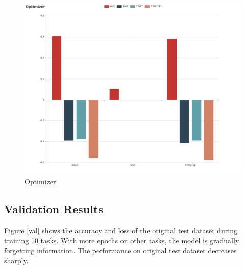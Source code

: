 \documentclass{article}
\begin{document}
\begin{figure}[htbp]
\centering
\includegraphics[scale=0.3]{img/Optimizer.png}
\caption{Optimizer}
\label{optimizer}
\end{figure}

\subsection{Validation Results}
Figure \ref{val} shows the accuracy and loss of the original test dataset during training 10 tasks. With more epochs on other tasks, the model is gradually forgetting information. The performance on original test dataset decreases sharply.
\end{document}
